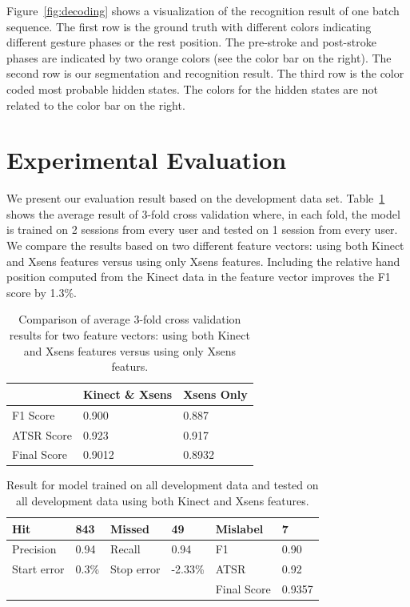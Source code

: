 \documentclass{acm_proc_article-sp}
\begin{document}
Figure~\ref{fig:decoding} shows a visualization of the recognition result of one batch sequence. The first
row is the ground truth with different colors indicating different gesture phases or the rest position.
The pre-stroke and post-stroke phases are indicated by two orange colors (see the color bar
on the right). The second row is our segmentation and recognition result.
The third row is the color coded most probable hidden states. The colors for the hidden states are not related 
to the color bar on the right.

\section{Experimental Evaluation}\label{sec:eval}
We present our evaluation result based on the development data set. 
Table~\ref{tab:comp-feature} shows the average result of 3-fold cross validation where, in each fold,
the model is trained on 2 sessions from every user and tested on 1 session from every user. We compare
the results based on two different feature vectors: using both Kinect and Xsens features versus using
only Xsens features. Including the relative hand position computed from 
the Kinect data in the feature vector improves the F1 score by 1.3\%.  

\begin{table}[tb]
\begin{center}
\begin{tabular}{|l|l|l|}
\hline
 & \textbf{Kinect \& Xsens} & \textbf{Xsens Only} \\
\hline
F1 Score & 0.900 & 0.887 \\
\hline
ATSR Score & 0.923 & 0.917 \\
\hline
Final Score & 0.9012 & 0.8932 \\
\hline
\end{tabular}
\caption{Comparison of average 3-fold cross validation results for two feature vectors:
using both Kinect and Xsens features versus using only Xsens featurs. }
\label{tab:comp-feature}
\end{center}
\end{table}

\begin{table}[tb]
\begin{center}
\begin{tabular}{|l|l|l|l|l|l|}
\hline
Hit & 843 & Missed & 49 & Mislabel & 7 \\
\hline
Precision & 0.94 & Recall & 0.94 & F1 & 0.90\\
\hline
Start error & 0.3\% & Stop error & -2.33\% & ATSR & 0.92  \\
\hline
& & & & Final Score & 0.9357  \\
\hline
\end{tabular}
\caption{Result for model trained on all development data and tested on all development 
data using both Kinect and Xsens features.}
\label{tab:dev-score}
\end{center}
\end{table}
\end{document}
